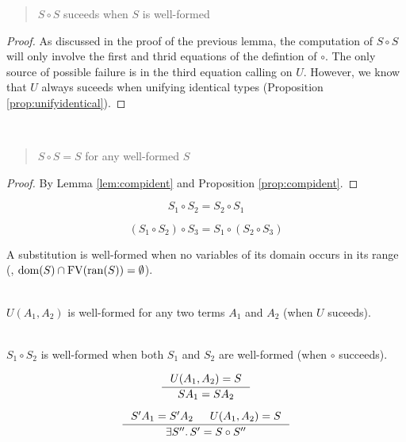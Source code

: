 \begin{proposition}
	\label{prop:compident}
\begin{quote} $S \circ S$ suceeds when $S$ is well-formed \end{quote}
\end{proposition}
\begin{proof}
As discussed in the proof of the previous lemma,
the computation of $S \circ S$ will only involve
the first and thrid equations of the defintion of $\circ$.
The only source of possible failure is in the third equation calling on $U$.
However, we know that $U$ always suceeds when unifying identical types
(Proposition \ref{prop:unifyidentical}).
\end{proof}

\begin{theorem} ~
	\begin{quote} $S\circ S = S$ for any well-formed $S$ \end{quote}
\end{theorem}
\begin{proof}
	By Lemma \ref{lem:compident} and Proposition \ref{prop:compident}.
\end{proof}

\begin{theorem}
	\[S_1\circ S_2 = S_2\circ S_1\]
\end{theorem}

\begin{theorem}
	\[(S_1\circ S_2) \circ S_3 = S_1 \circ (S_2 \circ S_3)\]
\end{theorem}


A substitution is well-formed when no variables of its domain
occurs in its range (\ie, $\mathop{\mathrm{dom}}(S)\cap\mathop{\mathrm{FV}}(\mathop{\mathrm{ran}}(S))=\emptyset$).

\begin{proposition}
	~\\ \indent
	$U(A_1,A_2)$ is well-formed for any two terms $A_1$ and $A_2$
	(when $U$ suceeds).
\end{proposition}

\begin{proposition}~\\
	\indent
$S_1\circ S_2$ is well-formed when both $S_1$ and $S_2$ are well-formed
(when $\circ$ succeeds).
\end{proposition}



\begin{theorem} \label{prop:uniU}
	\[ \inference{U(A_1,A_2)=S}{S A_1 = S A_2}\]
\end{theorem}

\begin{theorem} \label{prop:mguU}
\[ \inference{S' A_1 = S' A_2 & U(A_1,A_2)=S}{\exists S''.\, S' = S\circ S''} \]
\end{theorem}
